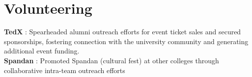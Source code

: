 \section{Volunteering}
    \begin{itemize}
	\small{\item{
		\textbf{TedX}{ : Spearheaded alumni outreach efforts for event ticket sales and secured sponsorships, fostering connection with the university community and generating additional event funding. }\vspace{3pt} \\
		\textbf{Spandan}{ : Promoted Spandan (cultural fest) at other colleges through collaborative intra-team outreach efforts} 
	}}
    \end{itemize}